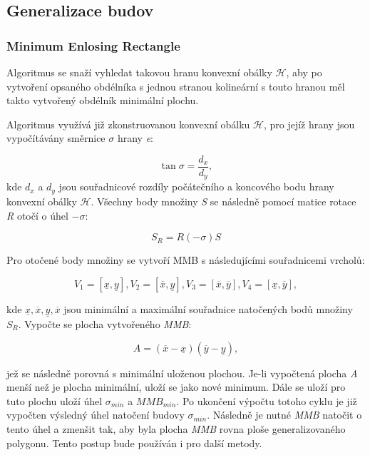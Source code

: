\documentclass[11pt]{article}
\begin{document}
	
	\subsection{Generalizace budov}
	\subsubsection{Minimum Enlosing Rectangle}
	Algoritmus se snaží vyhledat takovou hranu konvexní obálky $\mathcal{H}$, aby po vytvoření opsaného obdélníka s jednou stranou kolineární s touto hranou měl takto vytvořený obdélník minimální plochu.
	
	Algoritmus využívá již zkonstruovanou konvexní obálku $\mathcal{H}$, pro jejíž hrany jsou vypočítávány směrnice $\sigma$ hrany \textit{e}: 
	
	\begin{equation}
		\tan\sigma=\frac{d_x}{d_y}, 
	\end{equation}
	kde $d_{x}$ a $d_{y}$ jsou souřadnicové rozdíly počátečního a koncového bodu hrany konvexní obálky $\mathcal{H}$. Všechny body množiny \textit{S} se následně pomocí matice rotace \textit{R} otočí o úhel $-\sigma$:
	
	\begin{equation}
		S_R=R(-\sigma)S 
	\end{equation}
	
		Pro otočené body množiny se vytvoří MMB s následujícími souřadnicemi vrcholů:
		
		\begin{equation}
			V_1 = [\underline{x}, \underline{y}], V_2 = [\overline{x}, \underline{y}],
			V_3 = [\overline{x}, \overline{y}],
			V_4 = [\underline{x}, \overline{y}],
		\end{equation}
		
		kde $\underline{x},\overline{x},\underline{y}, \overline{x}$ jsou minimální a maximální souřadnice natočených bodů množiny \textit{$ S_R $}. Vypočte se plocha vytvořeného \textit{MMB}:
		
		\begin{equation}
			A = (\overline{x}-\underline{x})(\overline{y}-\underline{y}),
		\end{equation}
		
		jež se následně porovná s minimální uloženou plochou. Je-li vypočtená plocha \textit{A} menší než je plocha minimální, uloží se jako nové minimum. Dále se uloží pro tuto plochu uloží úhel $ \sigma_{min} $ a \textit{$MMB_{min}$}. Po ukončení výpočtu 
		totoho cyklu je již vypočten výsledný úhel natočení budovy $ \sigma_{min} $. Následně je nutné \textit{MMB} natočit o tento úhel a zmenšit tak, aby byla plocha \textit{MMB} rovna ploše generalizovaného polygonu. Tento postup bude používán i pro další metody.
		
\end{document}

